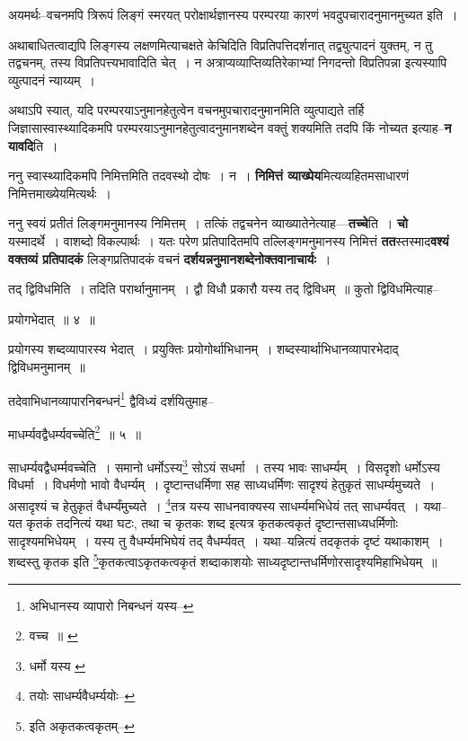 \documentclass[article,12pt,a4paper]{memoir}
\begin{document}
	  \pstart अयमर्थः--वचनमपि त्रिरूपं लिङ्गं स्मरयत् परोक्षार्थज्ञानस्य परम्परया कारणं भवदुपचारादनुमानमुच्यत इति ।
	\pend
      

	  \pstart अथाबाधितत्वाद्यपि लिङ्गस्य लक्षणमित्याचक्षते केचिदिति विप्रतिपत्तिदर्शनात् तद्व्युत्पादनं युक्तम्, न तु तद्वचनम्, तस्य विप्रतिपत्त्यभावादिति चेत् । न अत्राप्यव्याप्तिव्यतिरेकाभ्यां निगदन्तो विप्रतिपन्ना इत्यस्यापि व्युत्पादनं न्याय्यम् ।
	\pend
      

	  \pstart अथाऽपि स्यात्, यदि परम्परयाऽनुमानहेतुत्वेन वचनमुपचारादनुमानमिति व्युत्पाद्यते तर्हि जिज्ञासास्वास्थ्यादिकमपि परम्परयाऽनुमानहेतुत्वादनुमानशब्देन वक्तुं शक्यमिति तदपि किं नोच्यत इत्याह--\textbf{न यावदि}ति ।
	\pend
      

	  \pstart ननु स्वास्थ्यादिकमपि निमित्तमिति तदवस्थो दोषः । न । \textbf{निमित्तं व्याख्पेय}मित्यव्यहितमसाधारणं निमित्तमाख्येयमित्यर्थः ।
	\pend
      

	  \pstart ननु स्वयं प्रतीतं लिङ्गमनुमानस्य निमित्तम् । तत्किं तद्वचनेन व्याख्यातेनेत्याह—\textbf{तच्चे}ति । \textbf{चो} यस्मादर्थे । वाशब्दो विकल्पार्थः । यतः परेण प्रतिपादितमपि तल्लिङ्गमनुमानस्य निमित्तं \textbf{तत}स्तस्माद\textbf{वश्यं वक्तव्यं प्र}\leavevmode{}\textbf{तिपादकं} लिङ्गप्रतिपादकं वचनं \textbf{दर्शयन्ननुमानशब्देनोक्तवानाचार्यः} ।
	\pend
      \leavevmode{}
	  \bigskip
	  \begingroup
	

	  \pstart तद् द्विविधमिति । तदिति परार्थानुमानम् । द्वौ विधौ प्रकारौ यस्य तद् द्विविधम् ॥ कुतो द्विविधमित्याह--
	\pend
       
	  \bigskip
	  \begingroup
	

	  \pstart प्रयोगभेदात् ॥ ४ ॥
	\pend
      
	  \endgroup
	 

	  \pstart प्रयोगस्य शब्दव्यापारस्य भेदात् । प्रयुक्तिः प्रयोगोर्थाभिधानम् । शब्दस्यार्थाभिधानव्यापारभेदाद् द्विविधमनुमानम् ॥
	\pend
       

	  \pstart तदेवाभिधानव्यापारनिबन्धनं\footnote{अभिधानस्य व्यापारो निबन्धनं यस्य--\cite{dp-msD-n}} द्वैविध्यं दर्शयितुमाह--
	\pend
       
	  \bigskip
	  \begingroup
	

	  \pstart माधर्म्यवद्वैधर्म्यवच्चेति\footnote{वच्च ॥ \cite{dp-msC}} ॥ ५ ॥
	\pend
      
	  \endgroup
	 

	  \pstart साधर्म्यवद्वैधर्म्मवच्चेति । समानो धर्मोऽस्य\footnote{धर्मो यस्य \cite{dp-msC} \cite{dp-msA} \cite{dp-edP} \cite{dp-edH} \cite{dp-edE} \cite{dp-edN}} सोऽयं सधर्मा । तस्य भावः साधर्म्यम् । विसदृशो धर्मोऽस्य विधर्मा । विधर्मणो भावो वैधर्म्यम् । दृष्टान्तधर्मिणा सह साध्यधर्मिणः सादृश्यं हेतुकृतं साधर्म्यमुच्यते । असादृश्यं च हेतुकृतं वैधर्म्यंमुच्यते । \footnote{तयोः साधर्म्यवैधर्म्ययोः--\cite{dp-msD-n}}तत्र यस्य साधनवाक्यस्य साधर्म्यमभिधेयं तत् साधर्म्यवत् । यथा--यत कृतकं तदनित्यं यथा घटः, तथा च कृतकः शब्द इत्यत्र कृतकत्वकृतं दृष्टान्तसाध्यधर्मिणोः सादृश्यमभिधेयम् । यस्य तु वैधर्म्यमभिघेयं तद् वैधर्म्यवत् । यथा--यन्नित्यं तदकृतकं दृष्टं यथाकाशम् । शब्दस्तु कृतक इति \footnote{इति अकृतकत्वकृतम्--\cite{dp-msC}}कृतकत्वाऽकृतकत्वकृतं शब्दाकाशयोः साध्यदृष्टान्तधर्मिणोरसादृश्यमिहाभिधेयम् ॥
	\pend
       
\end{document}
